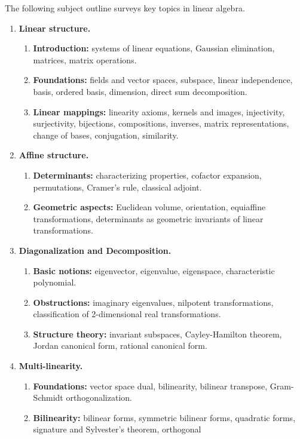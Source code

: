 \documentclass[12pt]{article}
\begin{document}
The following subject outline surveys 
key topics in linear algebra.

\begin{enumerate}
\item {\bf Linear structure.}
  \begin{enumerate}
  \item {\bf Introduction:} systems of linear equations, Gaussian
    elimination, matrices, matrix operations.
  \item {\bf Foundations:} fields and vector spaces, subspace, linear
    independence, basis, ordered basis, dimension, direct sum decomposition.
  \item {\bf Linear mappings:} linearity axioms, kernels and images,
    injectivity, surjectivity, bijections, compositions, inverses,
    matrix representations, change of bases, conjugation, similarity.
  \end{enumerate}
\item {\bf Affine structure.}
  \begin{enumerate}
  \item {\bf Determinants:} characterizing properties, cofactor
    expansion, permutations, Cramer's rule, classical adjoint.
  \item {\bf Geometric aspects:} Euclidean volume, orientation,
    equiaffine transformations, determinants as geometric invariants
    of linear transformations.
  \end{enumerate}
\item {\bf Diagonalization and Decomposition.}
  \begin{enumerate}
  \item {\bf Basic notions:} eigenvector, eigenvalue, eigenspace,
    characteristic polynomial.
  \item {\bf Obstructions:} imaginary eigenvalues, nilpotent
    transformations, classification of 2-dimensional real
    transformations.
  \item {\bf Structure theory:} invariant subspaces, Cayley-Hamilton
    theorem, Jordan canonical form, rational canonical form.
  \end{enumerate}
\item {\bf Multi-linearity.}
  \begin{enumerate}
  \item {\bf Foundations:} vector space dual, bilinearity, bilinear
    transpose, Gram-Schmidt orthogonalization.
  \item {\bf Bilinearity:} bilinear forms, symmetric bilinear forms,
    quadratic forms, signature and Sylvester's theorem, orthogonal

\end{enumerate}
\end{enumerate}
\end{document}
